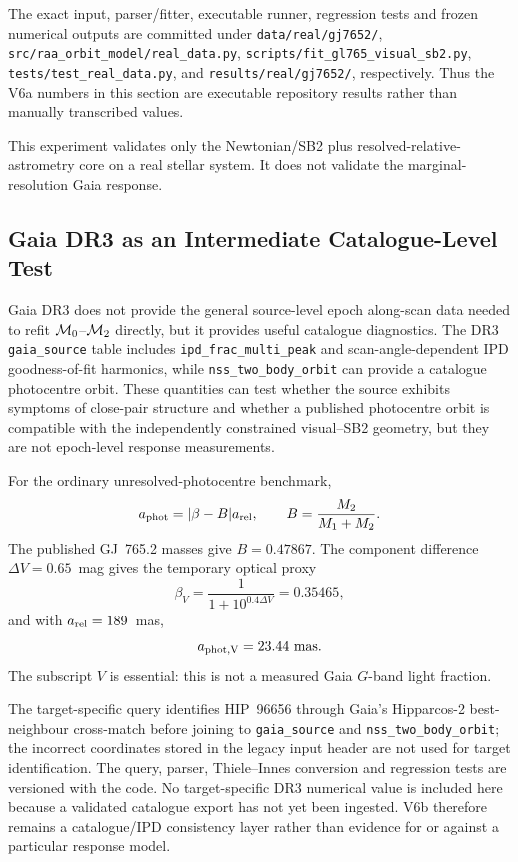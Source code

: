 The exact input, parser/fitter, executable runner, regression tests and frozen numerical outputs are committed under \texttt{data/real/gj7652/}, \texttt{src/raa\_orbit\_model/real\_data.py}, \texttt{scripts/fit\_gl765\_visual\_sb2.py}, \texttt{tests/test\_real\_data.py}, and \texttt{results/real/gj7652/}, respectively. Thus the V6a numbers in this section are executable repository results rather than manually transcribed values.

This experiment validates only the Newtonian/SB2 plus resolved-relative-astrometry core on a real stellar system. It does not validate the marginal-resolution Gaia response.

\subsection{Gaia DR3 as an Intermediate Catalogue-Level Test}
\label{sect:dr3bridge}

Gaia DR3 does not provide the general source-level epoch along-scan data needed to refit $\mathcal{M}_0$--$\mathcal{M}_2$ directly, but it provides useful catalogue diagnostics. The DR3 \texttt{gaia\_source} table includes \texttt{ipd\_frac\_multi\_peak} and scan-angle-dependent IPD goodness-of-fit harmonics, while \texttt{nss\_two\_body\_orbit} can provide a catalogue photocentre orbit. These quantities can test whether the source exhibits symptoms of close-pair structure and whether a published photocentre orbit is compatible with the independently constrained visual--SB2 geometry, but they are not epoch-level response measurements.

For the ordinary unresolved-photocentre benchmark,
\begin{equation}
a_{\rm phot}=|\beta-B|a_{\rm rel},\qquad
B=\frac{M_2}{M_1+M_2}.
\end{equation}
The published GJ~765.2 masses give $B=0.47867$. The component difference $\Delta V=0.65$~mag gives the temporary optical proxy
\begin{equation}
\beta_V=\frac{1}{1+10^{0.4\Delta V}}=0.35465,
\end{equation}
and with $a_{\rm rel}=189$~mas,
\begin{equation}
a_{\rm phot,V}=23.44~{\rm mas}.
\label{eq:gl765_phot_benchmark}
\end{equation}
The subscript $V$ is essential: this is not a measured Gaia $G$-band light fraction.

The target-specific query identifies HIP~96656 through Gaia's Hipparcos-2 best-neighbour cross-match before joining to \texttt{gaia\_source} and \texttt{nss\_two\_body\_orbit}; the incorrect coordinates stored in the legacy input header are not used for target identification. The query, parser, Thiele--Innes conversion and regression tests are versioned with the code. No target-specific DR3 numerical value is included here because a validated catalogue export has not yet been ingested. V6b therefore remains a catalogue/IPD consistency layer rather than evidence for or against a particular response model.

